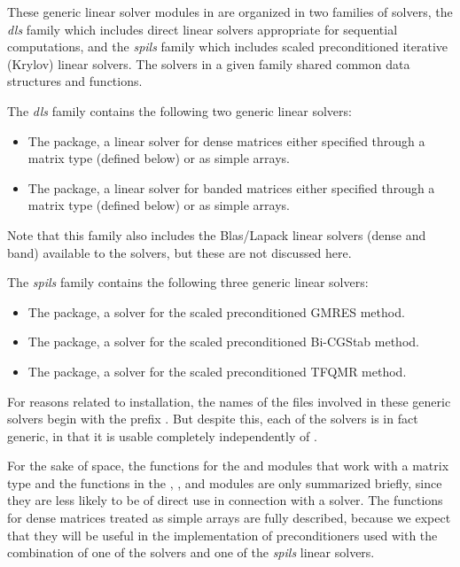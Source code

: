 These generic linear solver modules in {\sundials} are organized in
two families of solvers, the {\em dls} family which includes direct
linear solvers appropriate for sequential computations, and the {\em spils}
family which includes scaled preconditioned iterative (Krylov) linear solvers.
The solvers in a given family shared common data structures and functions.

The {\em dls} family contains the following two generic linear solvers:
\begin{itemize}
\item The {\dense} package, a linear solver for dense matrices either specified 
  through a matrix type (defined below) or as simple arrays.
\item The {\band} package, a linear solver for banded matrices either specified 
  through a matrix type (defined below) or as simple arrays.
\end{itemize}
Note that this family also includes the Blas/Lapack linear solvers (dense and band) 
available to the {\sundials} solvers, but these are not discussed here.

The {\em spils} family contains the following three generic linear solvers:
\begin{itemize}
\item The {\spgmr} package, a solver for the scaled preconditioned GMRES method.
\item The {\spbcg} package, a solver for the scaled preconditioned Bi-CGStab method.
\item The {\sptfqmr} package, a solver for the scaled preconditioned TFQMR method.
\end{itemize}

For reasons related to installation, the names of the files involved
in these generic solvers begin with the prefix .  But
despite this, each of the solvers is in fact generic, in that it is
usable completely independently of {\sundials}.

For the sake of space, the functions for the  and  modules
that work with a matrix type and the functions in the {\spgmr}, {\spbcg}, and {\sptfqmr}
modules are only summarized briefly, since they are less likely to be of direct use
in connection with a {\sundials} solver.  The functions for dense matrices 
treated as simple arrays are fully described, because we expect that they will be 
useful in the implementation of preconditioners used with the combination of one of
the {\sundials} solvers and one of the {\em spils} linear solvers.



